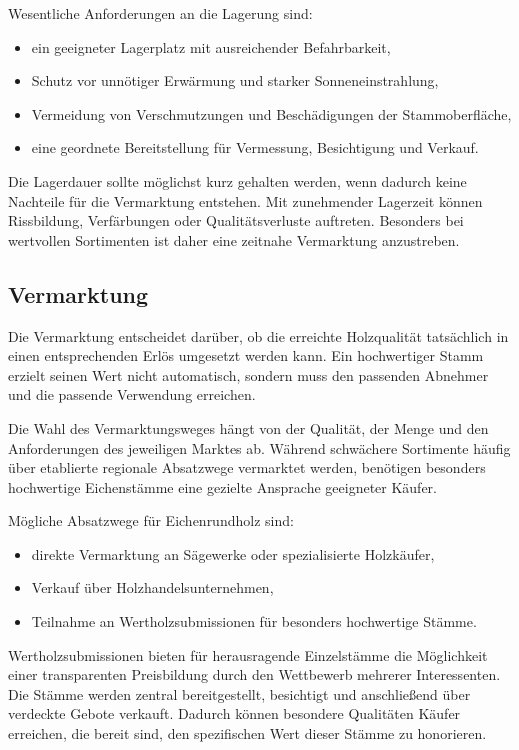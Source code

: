 \documentclass[twocolumn, bibliography=totoc, abstract=true]{scrartcl}
\begin{document}
Wesentliche Anforderungen an die Lagerung sind:

\begin{itemize}
\item ein geeigneter Lagerplatz mit ausreichender Befahrbarkeit,
\item Schutz vor unnötiger Erwärmung und starker Sonneneinstrahlung,
\item Vermeidung von Verschmutzungen und Beschädigungen der Stammoberfläche,
\item eine geordnete Bereitstellung für Vermessung, Besichtigung und Verkauf.
\end{itemize}

Die Lagerdauer sollte möglichst kurz gehalten werden, wenn dadurch keine Nachteile für die Vermarktung entstehen. Mit zunehmender Lagerzeit können Rissbildung, Verfärbungen oder Qualitätsverluste auftreten. Besonders bei wertvollen Sortimenten ist daher eine zeitnahe Vermarktung anzustreben.

\subsection{Vermarktung}

Die Vermarktung entscheidet darüber, ob die erreichte Holzqualität tatsächlich in einen entsprechenden Erlös umgesetzt werden kann. Ein hochwertiger Stamm erzielt seinen Wert nicht automatisch, sondern muss den passenden Abnehmer und die passende Verwendung erreichen.

Die Wahl des Vermarktungsweges hängt von der Qualität, der Menge und den Anforderungen des jeweiligen Marktes ab. Während schwächere Sortimente häufig über etablierte regionale Absatzwege vermarktet werden, benötigen besonders hochwertige Eichenstämme eine gezielte Ansprache geeigneter Käufer.

Mögliche Absatzwege für Eichenrundholz sind:

\begin{itemize}
\item direkte Vermarktung an Sägewerke oder spezialisierte Holzkäufer,
\item Verkauf über Holzhandelsunternehmen,
\item Teilnahme an Wertholzsubmissionen für besonders hochwertige Stämme.
\end{itemize}

Wertholzsubmissionen bieten für herausragende Einzelstämme die Möglichkeit einer transparenten Preisbildung durch den Wettbewerb mehrerer Interessenten. Die Stämme werden zentral bereitgestellt, besichtigt und anschließend über verdeckte Gebote verkauft. Dadurch können besondere Qualitäten Käufer erreichen, die bereit sind, den spezifischen Wert dieser Stämme zu honorieren.
\end{document}
